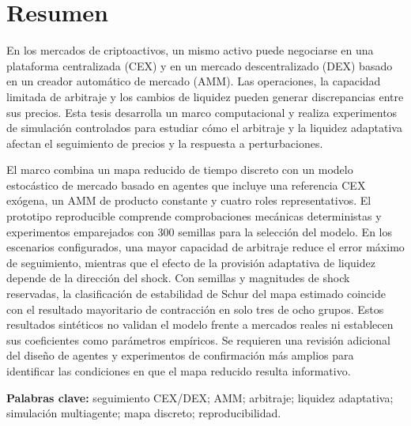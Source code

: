\section{Resumen}

En los mercados de criptoactivos, un mismo activo puede negociarse en una plataforma centralizada (CEX) y en un mercado descentralizado (DEX) basado en un creador automático de mercado (AMM). Las operaciones, la capacidad limitada de arbitraje y los cambios de liquidez pueden generar discrepancias entre sus precios. Esta tesis desarrolla un marco computacional y realiza experimentos de simulación controlados para estudiar cómo el arbitraje y la liquidez adaptativa afectan el seguimiento de precios y la respuesta a perturbaciones.

El marco combina un mapa reducido de tiempo discreto con un modelo estocástico de mercado basado en agentes que incluye una referencia CEX exógena, un AMM de producto constante y cuatro roles representativos. El prototipo reproducible comprende comprobaciones mecánicas deterministas y experimentos emparejados con 300 semillas para la selección del modelo. En los escenarios configurados, una mayor capacidad de arbitraje reduce el error máximo de seguimiento, mientras que el efecto de la provisión adaptativa de liquidez depende de la dirección del shock. Con semillas y magnitudes de shock reservadas, la clasificación de estabilidad de Schur del mapa estimado coincide con el resultado mayoritario de contracción en solo tres de ocho grupos. Estos resultados sintéticos no validan el modelo frente a mercados reales ni establecen sus coeficientes como parámetros empíricos. Se requieren una revisión adicional del diseño de agentes y experimentos de confirmación más amplios para identificar las condiciones en que el mapa reducido resulta informativo.

\textbf{Palabras clave:} seguimiento CEX/DEX; AMM; arbitraje; liquidez adaptativa; simulación multiagente; mapa discreto; reproducibilidad.
